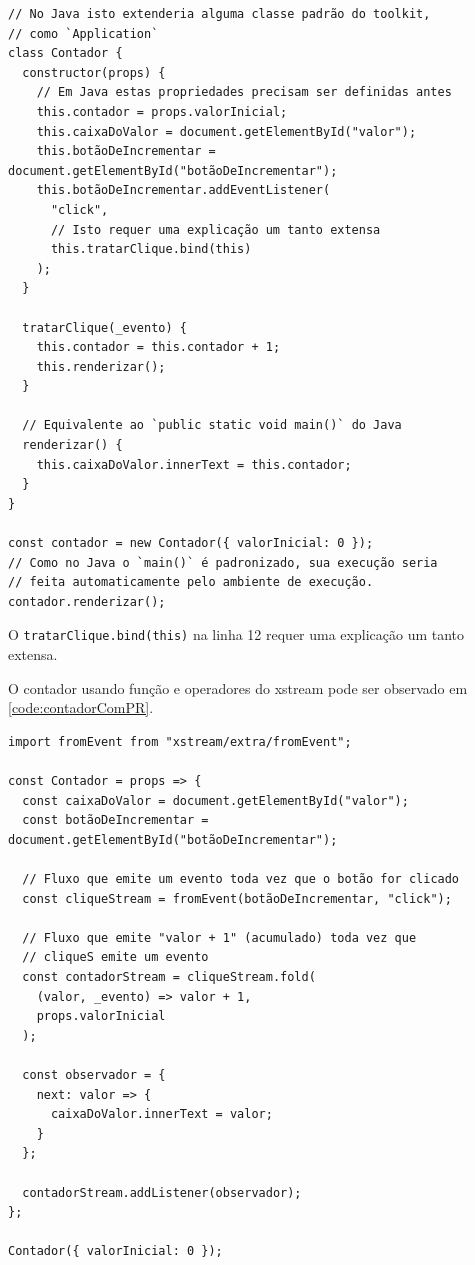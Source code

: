\begin{listing}[htbp]
\caption{\label{code:contadorComPOO}Contador com POO.}
\begin{verbatim}
// No Java isto extenderia alguma classe padrão do toolkit,
// como `Application`
class Contador {
  constructor(props) {
    // Em Java estas propriedades precisam ser definidas antes
    this.contador = props.valorInicial;
    this.caixaDoValor = document.getElementById("valor");
    this.botãoDeIncrementar = document.getElementById("botãoDeIncrementar");
    this.botãoDeIncrementar.addEventListener(
      "click",
      // Isto requer uma explicação um tanto extensa
      this.tratarClique.bind(this)
    );
  }

  tratarClique(_evento) {
    this.contador = this.contador + 1;
    this.renderizar();
  }

  // Equivalente ao `public static void main()` do Java
  renderizar() {
    this.caixaDoValor.innerText = this.contador;
  }
}

const contador = new Contador({ valorInicial: 0 });
// Como no Java o `main()` é padronizado, sua execução seria
// feita automaticamente pelo ambiente de execução.
contador.renderizar();
\end{verbatim}
\end{listing}

O \texttt{tratarClique.bind(this)} na linha 12 requer uma explicação um tanto
extensa.

O contador usando função e operadores do xstream pode ser observado em
\ref{code:contadorComPR}.

\begin{listing}[htbp]
\caption{\label{code:contadorComPR}Contador com PR.}
\begin{verbatim}
import fromEvent from "xstream/extra/fromEvent";

const Contador = props => {
  const caixaDoValor = document.getElementById("valor");
  const botãoDeIncrementar = document.getElementById("botãoDeIncrementar");

  // Fluxo que emite um evento toda vez que o botão for clicado
  const cliqueStream = fromEvent(botãoDeIncrementar, "click");

  // Fluxo que emite "valor + 1" (acumulado) toda vez que
  // cliqueS emite um evento
  const contadorStream = cliqueStream.fold(
    (valor, _evento) => valor + 1,
    props.valorInicial
  );

  const observador = {
    next: valor => {
      caixaDoValor.innerText = valor;
    }
  };

  contadorStream.addListener(observador);
};

Contador({ valorInicial: 0 });
\end{verbatim}
\end{listing}
